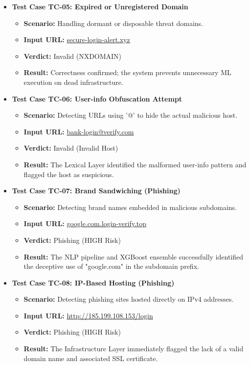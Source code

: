 \begin{itemize}
    \item \textbf{Test Case TC-05: Expired or Unregistered Domain}
    \begin{itemize}
        \item \textbf{Scenario:} Handling dormant or disposable threat domains.
        \item \textbf{Input URL:} \url{secure-login-alert.xyz}
        \item \textbf{Verdict:} Invalid (NXDOMAIN)
        \item \textbf{Result:} Correctness confirmed; the system prevents unnecessary ML execution on dead infrastructure.
    \end{itemize}

    \item \textbf{Test Case TC-06: User-info Obfuscation Attempt}
    \begin{itemize}
        \item \textbf{Scenario:} Detecting URLs using '@' to hide the actual malicious host.
        \item \textbf{Input URL:} \url{bank-login@verify.com}
        \item \textbf{Verdict:} Invalid (Invalid Host)
        \item \textbf{Result:} The Lexical Layer identified the malformed user-info pattern and flagged the host as suspicious.
    \end{itemize}

    \item \textbf{Test Case TC-07: Brand Sandwiching (Phishing)}
    \begin{itemize}
        \item \textbf{Scenario:} Detecting brand names embedded in malicious subdomains.
        \item \textbf{Input URL:} \url{google.com.login-verify.top}
        \item \textbf{Verdict:} Phishing (HIGH Risk)
        \item \textbf{Result:} The NLP pipeline and XGBoost ensemble successfully identified the deceptive use of "google.com" in the subdomain prefix.
    \end{itemize}

    \item \textbf{Test Case TC-08: IP-Based Hosting (Phishing)}
    \begin{itemize}
        \item \textbf{Scenario:} Detecting phishing sites hosted directly on IPv4 addresses.
        \item \textbf{Input URL:} \url{http://185.199.108.153/login}
        \item \textbf{Verdict:} Phishing (HIGH Risk)
        \item \textbf{Result:} The Infrastructure Layer immediately flagged the lack of a valid domain name and associated SSL certificate.
    \end{itemize}
\end{itemize}

